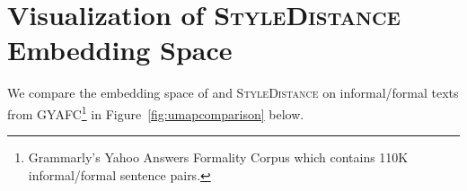 \newpage
\section{Visualization of \textsc{StyleDistance} Embedding Space}
\label{sec:appendix:umap}

We compare the embedding space of \citet{styleemb} and \textsc{StyleDistance} on informal/formal texts from GYAFC\footnote{ Grammarly’s Yahoo Answers Formality Corpus which contains 110K informal/formal sentence pairs.} \citep{gyafc} in Figure~\ref{fig:umapcomparison} below.

\umapfig
